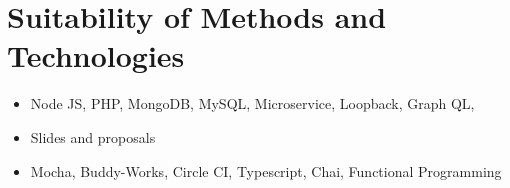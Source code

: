%
\section{Suitability of Methods and Technologies}
\begin{itemize}
	\item Node JS, PHP, MongoDB, MySQL, Microservice, Loopback, Graph QL,
	\item Slides and proposals
	\item Mocha, Buddy-Works, Circle CI, Typescript, Chai, Functional Programming
\end{itemize}
